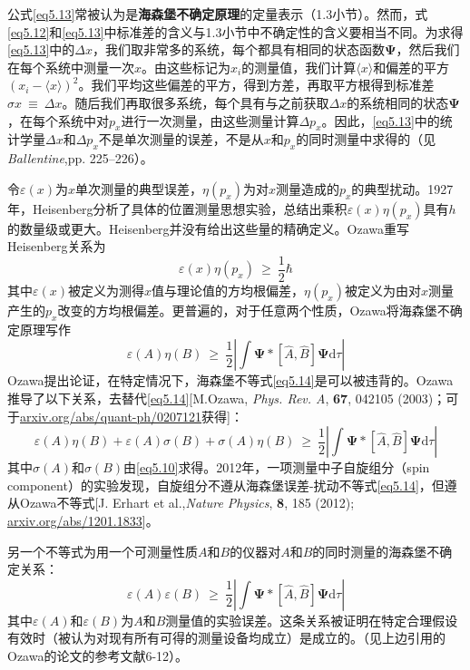 \documentclass[12pt,a4paper,openany]{ctexbook}
\newcommand{\abs}[1]{\left| #1 \right|}
\newcommand{\ang}[1]{\langle #1 \rangle}
\newcommand{\bp}{\bm{\Psi}}
\newcommand{\dd}[1]{\mathrm{d} #1}
\begin{document}
\begin{flushleft}
公式\eqref{eq5.13}常被认为是\textbf{海森堡不确定原理}的定量表示（1.3小节）。然而，式\eqref{eq5.12}和\eqref{eq5.13}中标准差的含义与1.3小节中不确定性的含义要相当不同。为求得\eqref{eq5.13}中的$\Delta x$，我们取非常多的系统，每个都具有相同的状态函数$\bp$，然后我们在每个系统中测量一次$x$。由这些标记为$x_i$的测量值，我们计算$\ang{x}$和偏差的平方$(x_i-\ang{x})^2$。我们平均这些偏差的平方，得到方差，再取平方根得到标准差$\sigma{x}\ \equiv\ \Delta x$。随后我们再取很多系统，每个具有与之前获取$\Delta x$的系统相同的状态$\bp$，在每个系统中对$p_x$进行一次测量，由这些测量计算$\Delta p_x$。因此，\eqref{eq5.13}中的统计学量$\Delta x$和$\Delta p_x$不是单次测量的误差，不是从$x$和$p_x$的同时测量中求得的（见\textit{Ballentine},pp. 225–226）。

令$\varepsilon(x)$为$x$单次测量的典型误差，$\eta(p_x)$为对$x$测量造成的$p_x$的典型扰动。1927年，Heisenberg分析了具体的位置测量思想实验，总结出乘积$\varepsilon(x)\eta(p_x)$具有$h$的数量级或更大。Heisenberg并没有给出这些量的精确定义。Ozawa重写Heisenberg关系为
\begin{equation*}
    \varepsilon(x)\eta(p_x)\ \geq\ \frac{1}{2}\hbar
\end{equation*}
其中$\varepsilon(x)$被定义为测得$x$值与理论值的方均根偏差，$\eta(p_x)$被定义为由对$x$测量产生的$p_x$改变的方均根偏差。更普遍的，对于任意两个性质，Ozawa将海森堡不确定原理写作
\begin{equation}
    \varepsilon(A)\eta(B)\ \geq\ \frac{1}{2}\abs{\int\bp*[\hat{A},\hat{B}]\bp\dd\tau} \label{eq5.14}
\end{equation}
Ozawa提出论证，在特定情况下，海森堡不等式\eqref{eq5.14}是可以被违背的。Ozawa推导了以下关系，去替代\eqref{eq5.14}[M.Ozawa, \textit{Phys. Rev. A}, \textbf{67}, 042105 (2003)；可于\url{arxiv.org/abs/quant-ph/0207121}获得]：
\begin{equation*}
    \varepsilon(A)\eta(B)+\varepsilon(A)\sigma(B)+\sigma(A)\eta(B)\ \geq\ \frac{1}{2}\abs{\int\bp*[\hat{A},\hat{B}]\bp\dd\tau}
\end{equation*}
其中$\sigma(A)$和$\sigma(B)$由\eqref{eq5.10}求得。2012年，一项测量中子自旋组分（spin component）的实验发现，自旋组分不遵从海森堡误差-扰动不等式\eqref{eq5.14}，但遵从Ozawa不等式[J. Erhart et al.,\textit{Nature Physics}, \textbf{8}, 185 (2012); \url{arxiv.org/abs/1201.1833}]。

另一个不等式为用一个可测量性质$A$和$B$的仪器对$A$和$B$的同时测量的海森堡不确定关系：
\begin{equation*}
    \varepsilon(A)\varepsilon(B)\ \geq\ \frac{1}{2}\abs{\int\bp*[\hat{A},\hat{B}]\bp\dd\tau}
\end{equation*}
其中$\varepsilon(A)$和$\varepsilon(B)$为$A$和$B$测量值的实验误差。这条关系被证明在特定合理假设有效时（被认为对现有所有可得的测量设备均成立）是成立的。（见上边引用的Ozawa的论文的参考文献6-12）。


\end{flushleft}
\end{document}
